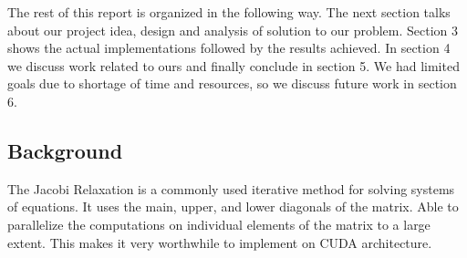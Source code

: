 \documentclass[10pt]{article}
\begin{document}
\begin{multicols}{2}
The rest of this report is organized in the following way.
The next section talks about our project idea, design and analysis of solution to our problem.
Section 3 shows the actual implementations followed by the results achieved.
In section 4 we discuss work related to ours and finally conclude in section 5.
We had limited goals due to shortage of time and resources, so we discuss future work in section 6.

    \subsection{Background} %
    The Jacobi Relaxation is a commonly used iterative method for solving systems of equations.
    It uses the main, upper, and lower diagonals of the matrix.
    Able to parallelize the computations on individual elements of the matrix to a large extent.
    This makes it very worthwhile to implement on CUDA architecture.


\end{multicols}
\end{document}
